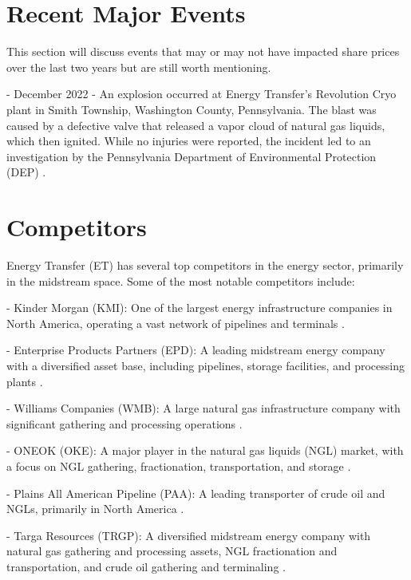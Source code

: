 \documentclass[9pt,a4paper,twoside]{tau}
\begin{document}
\section{Recent Major Events}
    
    This section will discuss events that may or may not have impacted share prices over the last two years but are still worth mentioning. 
    
    - December 2022 - An explosion occurred at Energy Transfer's Revolution Cryo plant in Smith Township, Washington County, Pennsylvania. The blast was caused by a defective valve that released a vapor cloud of natural gas liquids, which then ignited. While no injuries were reported, the incident led to an investigation by the Pennsylvania Department of Environmental Protection (DEP) \cite{commonwealth-of-pennsylvania-department-of-environmental-protection-air-quality-program-2023} \cite{energy-transfer-2024}.


\section{Competitors}
    
    Energy Transfer (ET) has several top competitors in the energy sector, primarily in the midstream space. Some of the most notable competitors include:
    
    - Kinder Morgan (KMI): One of the largest energy infrastructure companies in North America, operating a vast network of pipelines and terminals \cite{seeking-alpha-no-date} \cite{tracxn-technologies-limited-no-date}.
    
    - Enterprise Products Partners (EPD): A leading midstream energy company with a diversified asset base, including pipelines, storage facilities, and processing plants \cite{seeking-alpha-no-date}.
      
    - Williams Companies (WMB): A large natural gas infrastructure company with significant gathering and processing operations \cite{seeking-alpha-no-date}.
    
    - ONEOK (OKE): A major player in the natural gas liquids (NGL) market, with a focus on NGL gathering, fractionation, transportation, and storage \cite{seeking-alpha-no-date}.
    
    - Plains All American Pipeline (PAA): A leading transporter of crude oil and NGLs, primarily in North America \cite{craftco-no-date}.
    
    - Targa Resources (TRGP): A diversified midstream energy company with natural gas gathering and processing assets, NGL fractionation and transportation, and crude oil gathering and terminaling \cite{craftco-no-date}.\\
    
\end{document}
